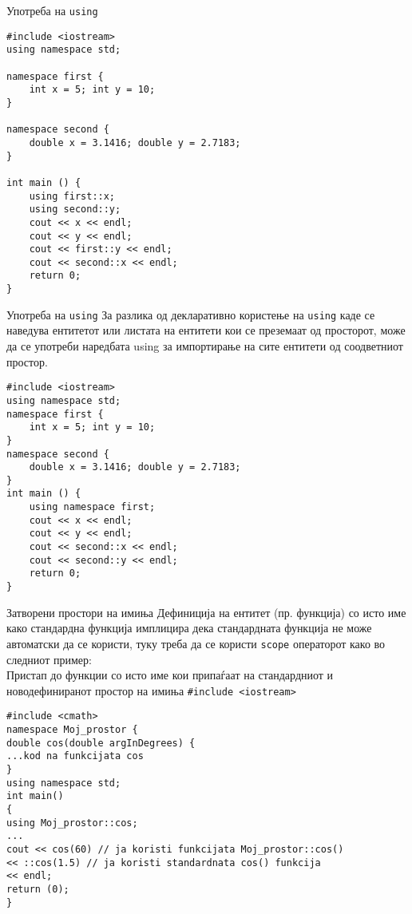\begin{frame}[fragile]{Употреба на \texttt{using}}
\begin{lstlisting}
#include <iostream> 
using namespace std; 

namespace first { 
    int x = 5; int y = 10; 
} 

namespace second { 
    double x = 3.1416; double y = 2.7183; 
}
 
int main () { 
    using first::x; 
    using second::y; 
    cout << x << endl; 
    cout << y << endl; 
    cout << first::y << endl; 
    cout << second::x << endl; 
    return 0; 
}
\end{lstlisting}
\end{frame}

\begin{frame}[fragile]{Употреба на \texttt{using}}
За разлика од декларативно користење на \texttt{using} каде се наведува ентитетот или
листата на ентитети кои се преземаат од просторот, може да се употреби наредбата
using за импортирање на сите ентитети од соодветниот простор.
\begin{lstlisting}
#include <iostream> 
using namespace std; 
namespace first { 
    int x = 5; int y = 10; 
}
namespace second { 
    double x = 3.1416; double y = 2.7183; 
} 
int main () { 
    using namespace first; 
    cout << x << endl;  
    cout << y << endl; 
    cout << second::x << endl; 
    cout << second::y << endl; 
    return 0; 
}
\end{lstlisting}
\end{frame}

\begin{frame}[fragile]{Затворени простори на имиња}
Дефиниција на ентитет (пр. функција) со исто име како стандардна функција
имплицира дека стандардната функција не може автоматски да се користи, туку
треба да се користи \texttt{scope} операторот како во следниот пример:\\
Пристап до функции со исто име кои припаѓаат на стандардниот и
новодефиниранот простор на имиња \texttt{\#include <iostream>}
\begin{lstlisting}
#include <cmath>
namespace Moj_prostor {
double cos(double argInDegrees) {
...kod na funkcijata cos
}
using namespace std;
int main()
{
using Moj_prostor::cos;
...
cout << cos(60) // ja koristi funkcijata Moj_prostor::cos()
<< ::cos(1.5) // ja koristi standardnata cos() funkcija
<< endl;
return (0);
}
\end{lstlisting}
\end{frame}

